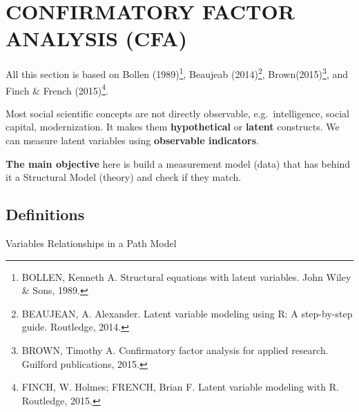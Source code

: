 \documentclass[
]{article}
\begin{document}
\hypertarget{confirmatory-factor-analysis-cfa}{%
\section{CONFIRMATORY FACTOR ANALYSIS
(CFA)}\label{confirmatory-factor-analysis-cfa}}

All this section is based on Bollen (1989)\footnote{BOLLEN, Kenneth A.
  Structural equations with latent variables. John Wiley \& Sons, 1989.},
Beaujeab (2014)\footnote{BEAUJEAN, A. Alexander. Latent variable
  modeling using R: A step-by-step guide. Routledge, 2014.},
Brown(2015)\footnote{BROWN, Timothy A. Confirmatory factor analysis for
  applied research. Guilford publications, 2015.}, and Finch \& French
(2015)\footnote{FINCH, W. Holmes; FRENCH, Brian F. Latent variable
  modeling with R. Routledge, 2015.}.

Most social scientific concepts are not directly observable,
e.g.~intelligence, social capital, modernization. It makes them
\textbf{hypothetical} or \textbf{latent} constructs. We can measure
latent variables using \textbf{observable indicators}.

\textbf{The main objective} here is build a measurement model (data)
that has behind it a Structural Model (theory) and check if they match.

\hypertarget{definitions}{%
\subsection{Definitions}\label{definitions}}

Variables Relationships in a Path Model
\end{document}
